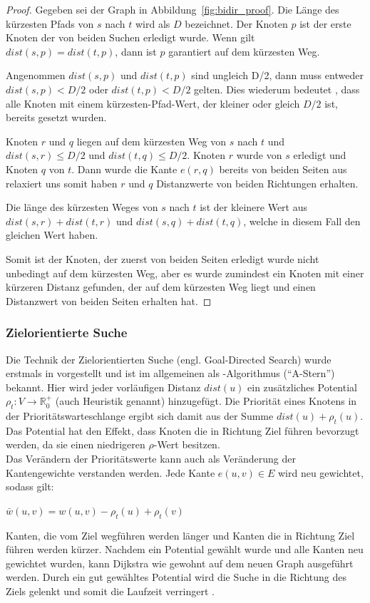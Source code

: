 \begin{proof}
    Gegeben sei der Graph in Abbildung~\ref{fig:bidir_proof}. Die Länge des kürzesten Pfads von $s$
    nach $t$ wird als $D$ bezeichnet. Der Knoten $p$ ist der erste Knoten der von beiden Suchen
    erledigt wurde. Wenn gilt $dist(s,p) = dist(t,p)$, dann ist $p$ garantiert auf dem kürzesten Weg.

    Angenommen $dist(s,p)$ und $dist(t,p)$ sind ungleich D/2, dann muss entweder ${dist(s,p) < D/2}$
    oder $dist(t,p) < D/2$ gelten. Dies wiederum bedeutet , dass alle Knoten mit einem
    kürzesten-Pfad-Wert, der kleiner oder gleich $D/2$ ist, bereits gesetzt wurden.

    Knoten $r$ und $q$ liegen auf dem kürzesten Weg von $s$ nach $t$ und ${dist(s,r) \le D/2}$ und
    ${dist(t,q) \le D/2}$. Knoten $r$ wurde von $s$ erledigt und Knoten $q$ von $t$. Dann wurde die
    Kante $e(r,q)$ bereits von beiden Seiten aus relaxiert uns somit haben $r$ und $q$ Distanzwerte
    von beiden Richtungen erhalten.

    Die länge des kürzesten Weges von $s$ nach $t$ ist der kleinere Wert aus ${dist(s,r) + dist(t,r)}$
    und ${dist(s,q) + dist(t,q)}$, welche in diesem Fall den gleichen Wert haben.

    Somit ist der Knoten, der zuerst von beiden Seiten erledigt wurde nicht unbedingt auf dem
    kürzesten Weg, aber es wurde zumindest ein Knoten mit einer kürzeren Distanz gefunden, der auf
    dem kürzesten Weg liegt und einen Distanzwert von beiden Seiten erhalten hat.
\end{proof}

\subsubsection{Zielorientierte Suche}
Die Technik der Zielorientierten Suche (engl. Goal-Directed Search) wurde erstmals in
\cite{Hart.1968} vorgestellt und ist im allgemeinen als \astar-Algorithmus ("`A-Stern"') bekannt.
Hier wird jeder vorläufigen Distanz $dist(u)$ ein zusätzliches Potential $\rho_t: V \rightarrow
    \mathbb{R}_0^+$ (auch Heuristik genannt) hinzugefügt. Die Priorität eines Knotens in der
Prioritätswarteschlange ergibt sich damit aus der Summe ${dist(u) + \rho_t(u)}$. Das Potential hat
den Effekt, dass Knoten die in Richtung Ziel führen bevorzugt werden, da sie einen niedrigeren
$\rho$-Wert besitzen.\\
Das Verändern der Prioritätswerte kann auch als Veränderung der Kantengewichte verstanden werden.
Jede Kante $e(u,v) \in E$ wird neu gewichtet, sodass gilt:
\begin{definition}
    $\bar{w}(u,v)=w(u,v)-\rho_t (u)+\rho_t (v)$
    \label{def:edge_weight}
\end{definition}
Kanten, die vom Ziel wegführen werden länger und Kanten die in Richtung Ziel führen werden kürzer.
Nachdem ein Potential gewählt wurde und alle Kanten neu gewichtet wurden, kann Dijkstra wie gewohnt
auf dem neuen Graph ausgeführt werden. Durch ein gut gewähltes Potential wird die Suche in die
Richtung des Ziels gelenkt und somit die Laufzeit verringert \cite{wagner}.\\

